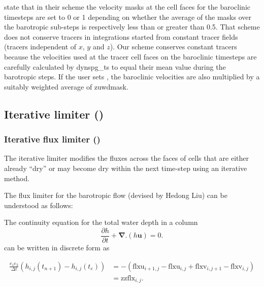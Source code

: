 \documentclass[../main/NEMO_manual]{subfiles}
\begin{document}
\cite{warner.defne.ea_CG13} state that in their scheme the velocity masks at the cell faces for the baroclinic
timesteps are set to 0 or 1 depending on whether the average of the masks over the barotropic sub-steps is respectively less than
or greater than 0.5. That scheme does not conserve tracers in integrations started from constant tracer
fields (tracers independent of $x$, $y$ and $z$). Our scheme conserves constant tracers because
the velocities used at the tracer cell faces on the baroclinic timesteps are carefully calculated by dynspg\_ts
to equal their mean value during the barotropic steps. If the user sets , the
baroclinic velocities are also multiplied by a suitably weighted average of zuwdmask.


\subsection[Iterative limiter (\textit{wet\_dry.F90})]{Iterative limiter ()}
\label{subsec:DYN_wd_iterative_limiter}

\subsubsection[Iterative flux limiter (\textit{wet\_dry.F90})]{Iterative flux limiter ()}
\label{subsec:DYN_wd_il_spg_limiter}

The iterative limiter modifies the fluxes across the faces of cells that are either already ``dry''
or may become dry within the next time-step using an iterative method.

The flux limiter for the barotropic flow (devised by Hedong Liu) can be understood as follows:

The continuity equation for the total water depth in a column
\begin{equation}
  \label{eq:DYN_wd_continuity}
  \frac{\partial h}{\partial t} + \mathbf{\nabla.}(h\mathbf{u}) = 0 .
\end{equation}
can be written in discrete form  as

\begin{align}
  \label{eq:DYN_wd_continuity_2}
  \frac{e_1 e_2}{\Delta t} ( h_{i,j}(t_{n+1}) - h_{i,j}(t_e) )
  &= - ( \mathrm{flxu}_{i+1,j} - \mathrm{flxu}_{i,j}  + \mathrm{flxv}_{i,j+1} - \mathrm{flxv}_{i,j} ) \\
  &= \mathrm{zzflx}_{i,j} .
\end{align}
\end{document}
